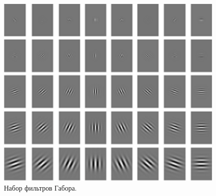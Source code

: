 \begin{figure}[h]
    \centering
    \includegraphics[height=0.35\textheight]{img/img_b.jpg}
    \caption{Набор фильтров Габора.}
    \label{img:gabnab}
\end{figure}
\vspace{\baselineskip}
\vspace{\baselineskip}
\vspace{\baselineskip}
\vspace{\baselineskip}
\vspace{\baselineskip}


